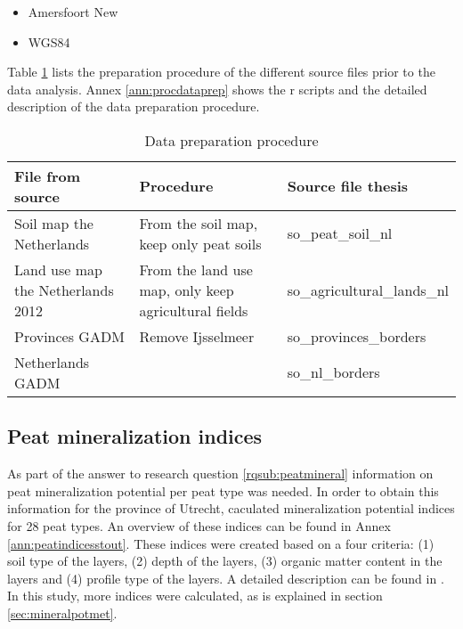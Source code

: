 \documentclass[a4paper,12pt]{scrbook}
\begin{document}
\begin{itemize}
\item Amersfoort New 
\item WGS84
\end{itemize}

Table \ref{tab:procdataprep} lists the preparation procedure of the different source files prior to the data analysis. Annex \ref{ann:procdataprep} shows the r scripts and the detailed description of the data preparation procedure.

\begin{table}[htbp]
\caption{Data preparation procedure}
\begin{center}
\begin{tabular}{|p{5cm}|p{5cm}|p{5cm}|}
\hline
\textbf{File from source} & \textbf{Procedure} & \textbf{Source file thesis} \\ \hline
Soil map the Netherlands & From the soil map, keep only peat soils & so\_peat\_soil\_nl \\ \hline
Land use map the Netherlands 2012 & From the land use map, only keep agricultural fields & so\_agricultural\_lands\_nl \\ \hline
Provinces GADM & Remove Ijsselmeer & so\_provinces\_borders \\ \hline
Netherlands GADM &  & so\_nl\_borders \\ \hline
\end{tabular}
\end{center}
\label{tab:procdataprep}
\end{table}


\subsection{Peat mineralization indices}
As part of the answer to research question \ref{rqsub:peatmineral} information on peat mineralization potential per peat type was needed. In order to obtain this information for the province of Utrecht, \citet{stouthamer2008toelichting} caculated mineralization potential indices for 28 peat types. An overview of these indices can be found in Annex \ref{ann:peatindicesstout}. These indices were created based on a four criteria: (1) soil type of the layers, (2) depth of the layers, (3) organic matter content in the layers and (4) profile type of the layers. A detailed description can be found in \citep{stouthamer2008toelichting}. In this study, more indices were calculated, as is explained in section \ref{sec:mineralpotmet}.
\end{document}
